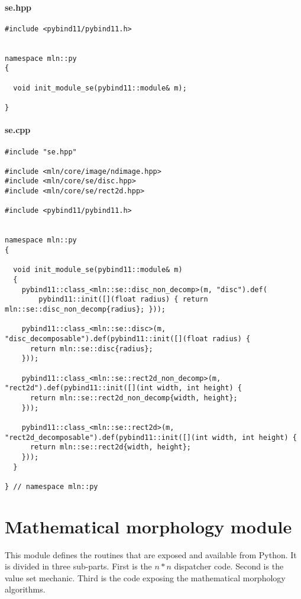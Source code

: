 \paragraph{se.hpp}

\begin{verbatim}
#include <pybind11/pybind11.h>


namespace mln::py
{

  void init_module_se(pybind11::module& m);

}
\end{verbatim}

\paragraph{se.cpp}

\begin{verbatim}
#include "se.hpp"

#include <mln/core/image/ndimage.hpp>
#include <mln/core/se/disc.hpp>
#include <mln/core/se/rect2d.hpp>

#include <pybind11/pybind11.h>


namespace mln::py
{

  void init_module_se(pybind11::module& m)
  {
    pybind11::class_<mln::se::disc_non_decomp>(m, "disc").def(
        pybind11::init([](float radius) { return mln::se::disc_non_decomp{radius}; }));

    pybind11::class_<mln::se::disc>(m, "disc_decomposable").def(pybind11::init([](float radius) {
      return mln::se::disc{radius};
    }));

    pybind11::class_<mln::se::rect2d_non_decomp>(m, "rect2d").def(pybind11::init([](int width, int height) {
      return mln::se::rect2d_non_decomp{width, height};
    }));

    pybind11::class_<mln::se::rect2d>(m, "rect2d_decomposable").def(pybind11::init([](int width, int height) {
      return mln::se::rect2d{width, height};
    }));
  }

} // namespace mln::py
\end{verbatim}


\clearpage

\section{Mathematical morphology module}
\label{appendix:static-dynamic-bridge.mm}

This module defines the routines that are exposed and available from Python. It is divided in three sub-parts. First is
the $n*n$ dispatcher code. Second is the value set mechanic. Third is the code exposing the mathematical morphology
algorithms.

